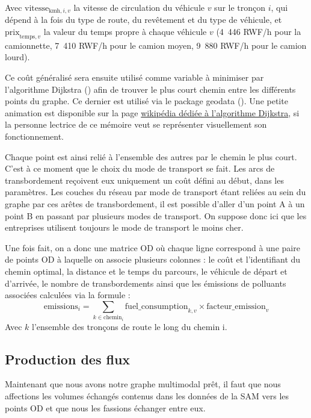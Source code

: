 \documentclass[12pt,a4paper,french]{report}
\begin{document}
	Avec $\text{vitesse}_{\text{kmh},i,v}$ la vitesse de circulation du véhicule $v$ sur le tronçon $i$, qui dépend à la fois du type de route, du revêtement et du type de véhicule, et $\text{prix}_{\text{temps},v}$ la valeur du temps propre à chaque véhicule $v$ (4~446 RWF/h pour la camionnette, 7~410 RWF/h pour le camion moyen, 9~880 RWF/h pour le camion lourd).

	Ce coût généralisé sera ensuite utilisé comme variable à minimiser par l'algorithme Dijkstra (\cite{Dijkstra1959}) afin de trouver le plus court chemin entre les différents points du graphe. Ce dernier est utilisé via le package geodata (\cite{Csardi2026igraph}). Une petite animation est disponible sur la page \href{https://fr.wikipedia.org/wiki/Algorithme_de_Dijkstra}{wikipédia dédiée à l'algorithme Dijkstra}, si la personne lectrice de ce mémoire veut se représenter visuellement son fonctionnement.
	
	Chaque point est ainsi relié à l'ensemble des autres par le chemin le plus court. C'est à ce moment que le choix du mode de transport se fait. Les arcs de transbordement reçoivent eux uniquement un coût défini au début, dans les paramètres. Les couches du réseau par mode de transport étant reliées au sein du graphe par ces arêtes de transbordement, il est possible d'aller d'un point A à un point B en passant par plusieurs modes de transport. On suppose donc ici que les entreprises utilisent toujours le mode de transport le moins cher.
	
	Une fois fait, on a donc une matrice OD où chaque ligne correspond à une paire de points OD à laquelle on associe plusieurs colonnes : le coût et l'identifiant du chemin optimal, la distance et le temps du parcours, le véhicule de départ et d'arrivée, le nombre de transbordements ainsi que les émissions de polluants associées calculées via la formule : 
	\begin{equation}
		\text{emissions}_i = \sum_{k \in \text{chemin}_i} \text{fuel\_consumption}_{k,v} \times \text{facteur\_emission}_v
	\end{equation} 
	Avec $k$ l'ensemble des tronçons de route le long du chemin i.
	
	\subsection{Production des flux}
	\label{subsec:prod_flux}
	
	Maintenant que nous avons notre graphe multimodal prêt, il faut que nous affections les volumes échangés contenus dans les données de la SAM vers les points OD et que nous les fassions échanger entre eux.
	
\end{document}
